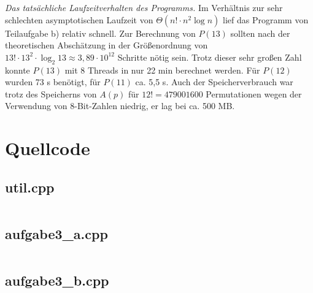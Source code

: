 \documentclass[a4paper, 10pt, ngerman]{article}
\begin{document}
\emph{Das tatsächliche Laufzeitverhalten des Programms.} Im Verhältnis zur sehr schlechten asymptotischen Laufzeit von $\Theta(n! \cdot n^2 \log n)$ lief das Programm von Teilaufgabe b) relativ schnell. Zur Berechnung von $P(13)$ sollten nach der theoretischen Abschätzung in der Größenordnung von $13! \cdot 13^2 \cdot \log_2 13 \approx 3,89 \cdot 10^{12}$ Schritte nötig sein. Trotz dieser sehr großen Zahl konnte $P(13)$ mit 8 Threads in nur 22 min berechnet werden. Für $P(12)$ wurden 73 s benötigt, für $P(11)$ ca. 5,5 s. Auch der Speicherverbrauch war trotz des Speicherns von $A(p)$ für $12! = 479001600$ Permutationen wegen der Verwendung von 8-Bit-Zahlen niedrig, er lag bei ca. 500 MB.  

\section{Quellcode}

\subsection{util.cpp}

\inputminted{c++}{aufgabe3/util.cpp}

\subsection{aufgabe3\_a.cpp}

\inputminted{c++}{aufgabe3/aufgabe3_a.cpp}

\subsection{aufgabe3\_b.cpp}

\inputminted{c++}{aufgabe3/aufgabe3_b.cpp}
\end{document}
